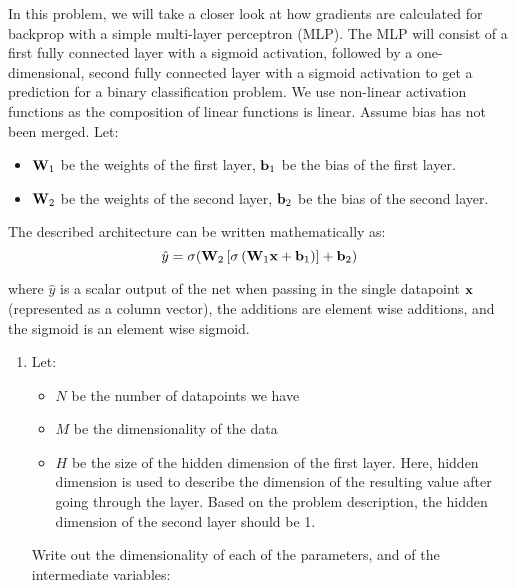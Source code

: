 \documentclass[submit]{harvardml}
\begin{document}
\newpage


\begin{problem}

    In this problem, we will take a closer look at how gradients are calculated for backprop with a simple multi-layer perceptron (MLP). The MLP will consist of a first fully connected layer with a sigmoid activation, followed by a one-dimensional, second fully connected layer with a sigmoid activation to get a prediction for a binary classification problem. We use non-linear activation functions as the composition of linear functions is linear. Assume bias has not been merged. Let:
    \begin{itemize}
        \item $\bold{W}_1$ be the weights of the first layer, $\bold{b}_1$ be the bias of the first layer.
        \item $\bold{W}_2$ be the weights of the second layer, $\bold{b}_2$ be the bias of the second layer.
    \end{itemize}
    
    The described architecture can be written mathematically as: $$\hat{y} = \sigma(\bold{W}_2 \left[\sigma \left(\bold{W}_1 \bold{x} + \bold{b}_1\right)\right] + \bold{b}_2)$$
    
    where $\hat{y}$ is a scalar output of the net when passing in the single datapoint $\bold{x}$ (represented as a column vector), the additions are element wise additions, and the sigmoid is an element wise sigmoid.
    
    \begin{enumerate}
        \item Let:
        \begin{itemize}
            \item $N$ be the number of datapoints we have
            \item $M$ be the dimensionality of the data
            \item $H$ be the size of the hidden dimension of the first layer. Here, hidden dimension is used to describe the dimension of the resulting value after going through the layer. Based on the problem description, the hidden dimension of the second layer should be 1.
        \end{itemize}
        
        Write out the dimensionality of each of the parameters, and of the intermediate variables:
  

\end{enumerate}
\end{problem}
\end{document}
